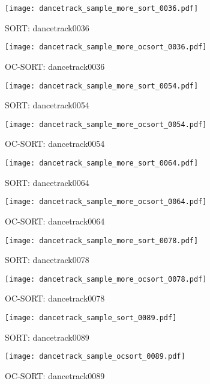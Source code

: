 \documentclass[10pt,twocolumn,letterpaper]{article}
\begin{document}
\begin{figure*}[!tp]
\setlength{\abovecaptionskip}{0.cm}
\captionsetup{aboveskip=0pt}\captionsetup{belowskip=0pt}
  \begin{subfigure}[t]{.48\textwidth}
    \centering
    \texttt{[image: dancetrack\_sample\_more\_sort\_0036.pdf]}
    \caption{SORT: dancetrack0036}
  \end{subfigure}
    \hfill
     \begin{subfigure}[t]{.48\textwidth}
    \centering
    \texttt{[image: dancetrack\_sample\_more\_ocsort\_0036.pdf]}
    \caption{OC-SORT: dancetrack0036}
  \end{subfigure}
  
  \begin{subfigure}[t]{.48\textwidth}
    \centering
    \texttt{[image: dancetrack\_sample\_more\_sort\_0054.pdf]}
    \caption{SORT: dancetrack0054}
  \end{subfigure}
    \hfill
     \begin{subfigure}[t]{.48\textwidth}
    \centering
    \texttt{[image: dancetrack\_sample\_more\_ocsort\_0054.pdf]}
    \caption{OC-SORT: dancetrack0054}
  \end{subfigure}
  
  \begin{subfigure}[t]{.48\textwidth}
    \centering
    \texttt{[image: dancetrack\_sample\_more\_sort\_0064.pdf]}
    \caption{SORT: dancetrack0064}
  \end{subfigure}
    \hfill
     \begin{subfigure}[t]{.48\textwidth}
    \centering
    \texttt{[image: dancetrack\_sample\_more\_ocsort\_0064.pdf]}
    \caption{OC-SORT: dancetrack0064}
  \end{subfigure}
  
  
  \begin{subfigure}[t]{.48\textwidth}
    \centering
    \texttt{[image: dancetrack\_sample\_more\_sort\_0078.pdf]}
    \caption{SORT: dancetrack0078}
  \end{subfigure}
    \hfill
     \begin{subfigure}[t]{.48\textwidth}
    \centering
    \texttt{[image: dancetrack\_sample\_more\_ocsort\_0078.pdf]}
    \caption{OC-SORT: dancetrack0078}
  \end{subfigure}
  
  \begin{subfigure}[t]{.48\textwidth}
    \centering
    \texttt{[image: dancetrack\_sample\_sort\_0089.pdf]}
    \caption{SORT: dancetrack0089}
  \end{subfigure}
    \hfill
     \begin{subfigure}[t]{.48\textwidth}
    \centering
    \texttt{[image: dancetrack\_sample\_ocsort\_0089.pdf]}
    \caption{OC-SORT: dancetrack0089}
  \end{subfigure}
  

\end{figure*}
\end{document}

